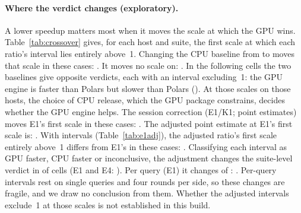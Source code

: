 \documentclass[11pt]{article}
\begin{document}
\paragraph{Where the verdict changes (exploratory).}
A lower speedup matters most when it moves the scale at which the GPU wins.
Table~\ref{tab:crossover} gives, for each host and suite, the first scale at
which each ratio's interval lies entirely above~1. Changing the CPU baseline from \polarsold{} to
\polarsnew{} moves that scale in these cases: . It
moves no scale on: . In the following cells the
two baselines give opposite verdicts, each with an interval excluding~1: the GPU
engine is faster than Polars \polarsold{} but slower than Polars \polarsnew{}
(). At those scales on those
hosts, the choice of CPU release, which the GPU package constrains, decides
whether the GPU engine helps.
\ifpcheck
The session correction (E1/K1; point estimates) moves E1's first scale in
these cases: . The adjusted point estimate at
E1's first scale is: .
\ifeadj
With intervals (Table~\ref{tab:e1adj}), the adjusted ratio's first scale
entirely above~1 differs from E1's in these cases:
. Classifying each
interval as GPU faster, CPU faster or inconclusive, the adjustment changes the
suite-level verdict in  of 
cells (E1 and E4: ). Per query (E1) it changes
 of :
. Per-query intervals rest on single queries and
four rounds per side, so these changes are fragile, and we draw no conclusion
from them.
\fi
\ifeadj\else
Whether the adjusted intervals exclude~1 at those scales is not established in
this build.
\fi
\fi
\end{document}
